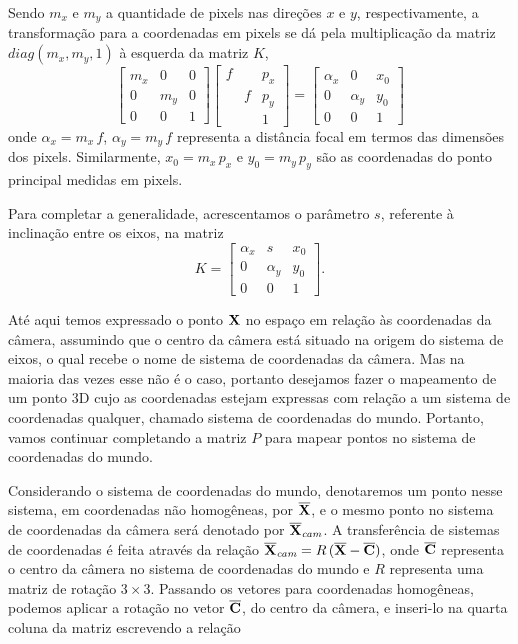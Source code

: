Sendo $m_x$ e $m_y$ a quantidade de pixels nas direções $x$ e $y$, respectivamente, a transformação para a coordenadas em pixels se dá pela multiplicação da matriz $diag(m_x,m_y,1)$ à esquerda da matriz $K$,
\begin{equation*}
\begin{bmatrix}
m_x&0&0\\
0&m_y&0\\
0&0&1
\end{bmatrix}      
\begin{bmatrix}
f& &p_x\\
&f&p_y\\
& &1
\end{bmatrix}
=
\begin{bmatrix}
\alpha_x&0&x_0\\
0&\alpha_y&y_0\\
0&0&1
\end{bmatrix}
\end{equation*}
onde $\alpha_x=m_x\,f$, $\alpha_y=m_y\,f$ representa a distância focal em termos das dimensões dos pixels. Similarmente, $x_0=m_x\,p_x$ e $y_0=m_y\,p_y$ são as coordenadas do ponto principal medidas em pixels.

Para completar a generalidade, acrescentamos o parâmetro $s$, referente à inclinação entre os eixos, na matriz
\begin{equation*}
K=
\begin{bmatrix}
\alpha_x&s&x_0\\
0&\alpha_y&y_0\\
0&0&1
\end{bmatrix}.
\end{equation*}






Até aqui temos expressado o ponto $\mathbf{X}$ no espaço em relação às coordenadas da câmera, assumindo que o centro da câmera está situado na origem do sistema de eixos, o qual recebe o nome de sistema de coordenadas da câmera. Mas na maioria das vezes esse não é o caso, portanto desejamos fazer o mapeamento de um ponto 3D cujo as coordenadas estejam expressas com relação a um sistema de coordenadas qualquer, chamado sistema de coordenadas do mundo. Portanto, vamos continuar completando a matriz $P$ para mapear pontos no sistema de coordenadas do mundo.

Considerando o sistema de coordenadas do mundo, denotaremos um ponto nesse sistema, em coordenadas não homogêneas, por $\overline{\mathbf{X}}$, e o mesmo ponto no sistema de coordenadas da câmera será denotado por $\overline{\mathbf{X}}_{\textit{cam}}$. A transferência de sistemas de coordenadas é feita através da relação $\overline{\mathbf{X}}_{\textit{cam}}=R\,(\overline{\mathbf{X}}-\overline{\bf C})$, onde $\overline{\bf C}$ representa o centro da câmera no sistema de coordenadas do mundo e $R$ representa uma matriz de rotação $3\times3$. Passando os vetores para coordenadas homogêneas, podemos aplicar a rotação no vetor $\overline{\bf C}$, do centro da câmera, e inseri-lo na quarta coluna da matriz escrevendo a relação

